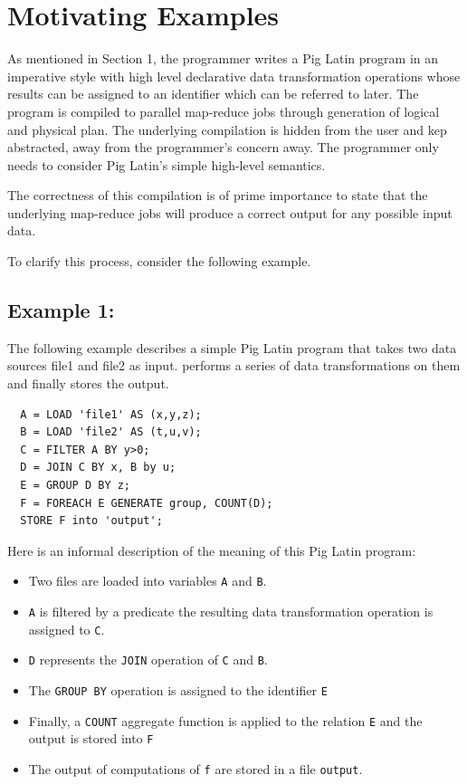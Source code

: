 \section{Motivating Examples}
\label{sec:motivation}

As mentioned in Section 1, the programmer writes a Pig Latin program in an imperative style with high level declarative data transformation operations whose results can be assigned to an identifier which can be referred to later. The program is compiled to parallel map-reduce jobs through generation of logical and physical plan. The underlying compilation is hidden from the user and kep abstracted, away from the programmer's concern away. The programmer only needs to consider Pig Latin's simple high-level semantics.

The correctness of this compilation is of prime importance to state that the underlying map-reduce jobs will produce a correct output for any possible input data.

To clarify this process, consider the following example.

\subsection{Example 1:}
\label{subsec:example1}

The following example \cite{gates2009building} describes a simple Pig Latin program that takes two data sources file1 and file2 as input. performs a series of data transformations on them and finally stores the output.
\begin{lstlisting}
  A = LOAD 'file1' AS (x,y,z);
  B = LOAD 'file2' AS (t,u,v);
  C = FILTER A BY y>0;
  D = JOIN C BY x, B by u;
  E = GROUP D BY z;
  F = FOREACH E GENERATE group, COUNT(D);
  STORE F into 'output';
\end{lstlisting}

Here is an informal description of the meaning of this Pig Latin program:

\begin{itemize}
  \item Two files are loaded into variables \texttt{A} and \texttt{B}.
  \item \texttt{A} is filtered by a predicate the resulting data transformation operation is assigned to \texttt{C}.
	\item \texttt{D} represents the \texttt{JOIN} operation of \texttt{C} and \texttt{B}.
	\item The \texttt{GROUP BY} operation is assigned to the identifier \texttt{E}
	\item Finally, a \texttt{COUNT} aggregate function is applied to the relation \texttt{E} and the output is stored into \texttt{F}
	\item The output of computations of \texttt{f} are stored in a file \texttt{output}.
\end{itemize}

